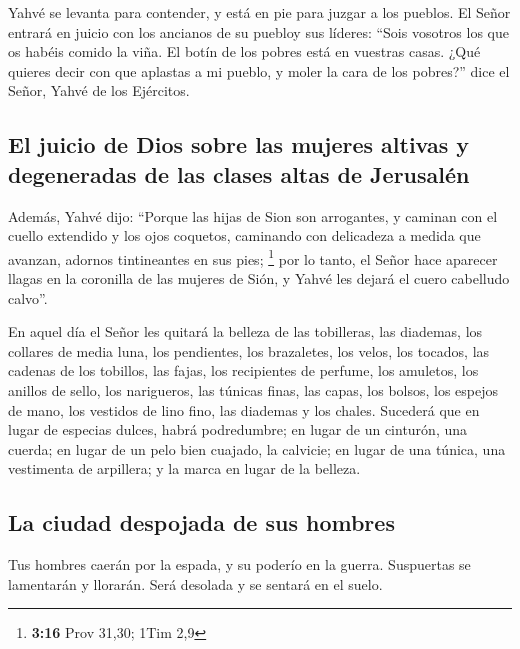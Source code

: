 \begin{paracol}{2}
 Yahvé se levanta para contender, y está en pie para
juzgar a los pueblos.  El Señor entrará en juicio con los
ancianos de su puebloy sus líderes: ``Sois vosotros los que os habéis
comido la viña. El botín de los pobres está en vuestras casas.
 ¿Qué quieres decir con que aplastas a mi pueblo, y moler
la cara de los pobres?'' dice el Señor, Yahvé de los Ejércitos.

\hypertarget{el-juicio-de-dios-sobre-las-mujeres-altivas-y-degeneradas-de-las-clases-altas-de-jerusaluxe9n}{%
\subsection{El juicio de Dios sobre las mujeres altivas y degeneradas de
las clases altas de
Jerusalén}\label{el-juicio-de-dios-sobre-las-mujeres-altivas-y-degeneradas-de-las-clases-altas-de-jerusaluxe9n}}

 Además, Yahvé dijo: ``Porque las hijas de Sion son
arrogantes, y caminan con el cuello extendido y los ojos coquetos,
caminando con delicadeza a medida que avanzan, adornos tintineantes en
sus pies; \footnote{\textbf{3:16} Prov 31,30; 1Tim 2,9} 
por lo tanto, el Señor hace aparecer llagas en la coronilla de las
mujeres de Sión, y Yahvé les dejará el cuero cabelludo calvo''.

 En aquel día el Señor les quitará la belleza de las
tobilleras, las diademas, los collares de media luna, 
los pendientes, los brazaletes, los velos,  los tocados,
las cadenas de los tobillos, las fajas, los recipientes de perfume, los
amuletos,  los anillos de sello, los narigueros,
 las túnicas finas, las capas, los bolsos,
 los espejos de mano, los vestidos de lino fino, las
diademas y los chales.  Sucederá que en lugar de especias
dulces, habrá podredumbre; en lugar de un cinturón, una cuerda; en lugar
de un pelo bien cuajado, la calvicie; en lugar de una túnica, una
vestimenta de arpillera; y la marca en lugar de la belleza.

\hypertarget{la-ciudad-despojada-de-sus-hombres}{%
\subsection{La ciudad despojada de sus
hombres}\label{la-ciudad-despojada-de-sus-hombres}}

 Tus hombres caerán por la espada, y su poderío en la
guerra.  Suspuertas se lamentarán y llorarán. Será
desolada y se sentará en el suelo.


\end{paracol}
